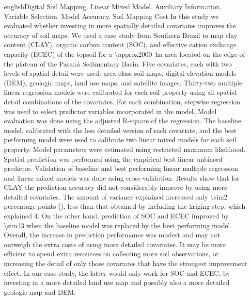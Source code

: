 \def\englishkeys{Digital Soil Mapping. Linear Mixed Model. Auxiliary Information. Variable Selection. Model
Accuracy. Soil Mapping Cost}
  
\begin{chapterabstract}{english}{\englishkeys}
In this study we evaluated whether investing in more spatially detailed covariates improves the accuracy of 
soil maps. We used a case study from Southern Brazil to map clay content (CLAY), organic carbon content 
(SOC), and effective cation exchange capacity (ECEC) of the topsoil for a \SI{\approx2000}{\hectare} area 
located on the edge of the plateau of the Paraná Sedimentary Basin. Five covariates, each with two levels of 
spatial detail were used: area-class soil maps, digital elevation models (DEM), geologic maps, land use maps, 
and satellite images. Thirty-two multiple linear regression models were calibrated for each soil property 
using all spatial detail combinations of the covariates. For each combination, stepwise regression was used to 
select predictor variables incorporated in the model. Model evaluation was done using the adjusted R-square of 
the regression. The baseline model, calibrated with the less detailed version of each covariate, and the best 
performing model were used to calibrate two linear mixed models for each soil property. Model parameters were 
estimated using restricted maximum likelihood. Spatial prediction was performed using the empirical best 
linear unbiased predictor. Validation of baseline and best performing linear multiple regression and linear 
mixed models was done using cross-validation. Results show that for CLAY the prediction accuracy did not 
considerably improve by using more detailed covariates. The amount of variance explained increased only 
\num{\sim2} percentage points (\si{\pp}), less than that obtained by including the kriging step, which 
explained \SI{4}{\pp}. On the other hand, prediction of SOC and ECEC improved by \SI{\sim13}{\pp} when the 
baseline model was replaced by the best performing model. Overall, the increase in prediction performance was 
modest and may not outweigh the extra costs of using more detailed covariates. It may be more efficient to 
spend extra resources on collecting more soil observations, or increasing the detail of only those covariates 
that have the strongest improvement effect. In our  case study, the latter would only work for SOC and ECEC, 
by investing in a more detailed land use map and possibly also a more detailed geologic map and DEM.
\end{chapterabstract}

